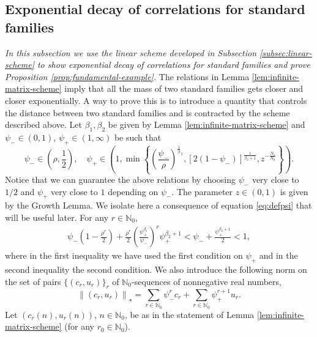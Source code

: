 \documentclass{amsart}
\numberwithin{equation}{section}
\newcommand\bN{{\mathbb N}}
\begin{document}
\subsection{Exponential decay of correlations for standard families} \textit{In this subsection we use the linear scheme developed in Subsection \ref{subsec:linear-scheme} to show exponential decay of correlations for standard families and prove Proposition \ref{prop:fundamental-example}.} The relations in Lemma \ref{lem:infinite-matrix-scheme} imply that all the mass of two standard families gets closer and closer exponentially. A way to prove this is to introduce a quantity that controls the distance between two standard families and is contracted by the scheme described above. Let \(\beta_1, \beta_2\) be given by Lemma \ref{lem:infinite-matrix-scheme} and \(\psi_- \in (0,1)\), \(\psi_+ \in (1, \infty)\) be such that
\begin{equation}\label{eq:defpsi}
    \psi_- \in \left(\rho, \frac 1 2\right), \quad \psi_+ \in \left(1, \min \left\{\left(\frac{\psi_-}{\rho}\right)^{\frac 1 \beta_1}, [2(1-\psi_-)]^{\frac{1}{\beta_2+1}}, z^{-\frac{N_c}{N_0}} \right\}\right).
\end{equation}
Notice that we can guarantee the above relations by choosing \(\psi_-\) very close to \(1/2\) and \(\psi_{+}\) very close to \(1\) depending on \(\psi_{-}\). The parameter \(z\in(0,1)\) is given by the Growth Lemma. We isolate here a consequence of equation \eqref{eq:defpsi} that will be useful later. For any \(r \in \bN_0\),
\begin{equation}\label{eq:uncunny-algebra}
\begin{split}
 \psi_- \left(1-\frac{\rho^r}{2}\right) + \frac{\rho^r}{2}\left(\frac{\psi_{+}^{\beta_1}}{\psi_{-}} \right)^r \psi_{+}^{\beta_2 + 1} < \psi_- + \frac{\psi_+^{\beta_2 +1}}{2}   <1,
\end{split}
\end{equation}
where in the first inequality we have used the first condition on \(\psi_{+}\) and in the second inequality the second condition. We also introduce the following norm on the set of pairs \(\{(c_r, u_r)\}_r\) of \(\bN_0\)-sequences of nonnegative real numbers,
\begin{equation}\label{eq:norm-def}
       \left\|(c_r,u_r)\right\|_{\star} = \sum_{r \in \bN_0} \psi_-^{r} c_r + \sum_{r \in \bN_0}\psi_+^{r+1}u_r.
\end{equation}
Let \((c_r(n),u_r(n))\), \(n \in \bN_0\), be as in the statement of Lemma \ref{lem:infinite-matrix-scheme} (for any \(r_0 \in \bN_0\)).
\end{document}
